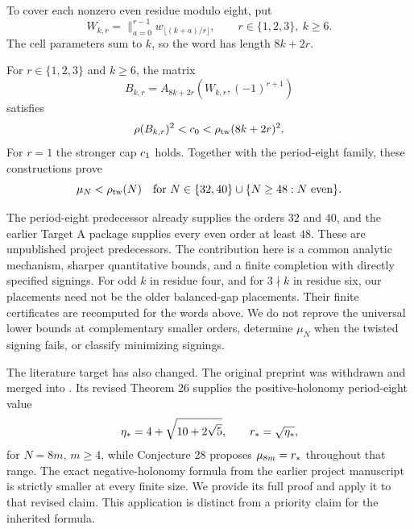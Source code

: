 To cover each nonzero even residue modulo eight, put
\[
 W_{k,r}=\mathop{\|}_{a=0}^{r-1}w_{\lfloor(k+a)/r\rfloor},
 \qquad r\in\{1,2,3\},\ k\ge6.
\]
The cell parameters sum to $k$, so the word has length $8k+2r$.
\begin{theorem}\label{thm:witnesses}
For $r\in\{1,2,3\}$ and $k\ge6$, the matrix
\[
 B_{k,r}=A_{8k+2r}(W_{k,r},(-1)^{r+1})
\]
satisfies
\begin{equation}
 \rho(B_{k,r})^2<c_0<\rho_{\mathrm{tw}}(8k+2r)^2.
 \label{eq:nonzero-witnesses}
\end{equation}
For $r=1$ the stronger cap $c_1$ holds. Together with the period-eight
family, these constructions prove
\[
 \mu_N<\rho_{\mathrm{tw}}(N)
 \quad\text{for }N\in\{32,40\}\cup\{N\ge48:N\text{ even}\}.
\]
\end{theorem}

The period-eight predecessor \cite{EarlierPeriodEight} already supplies the
orders $32$ and $40$, and the earlier Target A package
\cite{EarlierTargetA} supplies every even order at least $48$.
These are unpublished project predecessors. The contribution here is a
common analytic mechanism, sharper quantitative bounds, and a finite
completion with directly specified signings. For odd $k$ in residue four, and for
$3\nmid k$ in residue six, our placements need not be the older balanced-gap
placements. Their finite certificates are recomputed for the words above.
We do not reprove the universal lower bounds at complementary smaller
orders, determine $\mu_N$ when the twisted signing fails, or classify
minimizing signings.

The literature target has also changed. The original preprint
\cite{Suvagiya2026old} was withdrawn and merged into
\cite{Suvagiya2026}. Its revised Theorem 26 supplies the positive-holonomy
period-eight value
\begin{equation}
 \eta_*=4+\sqrt{10+2\sqrt5},\qquad r_*=\sqrt{\eta_*},
 \label{eq:rstar}
\end{equation}
for $N=8m$, $m\ge4$, while Conjecture 28 proposes $\mu_{8m}=r_*$
throughout that range. The exact negative-holonomy formula from the earlier
project manuscript \cite{EarlierPeriodEight} is strictly smaller at every
finite size. We provide its full proof and apply it to that revised claim.
This application is distinct from a priority claim for the inherited formula.

